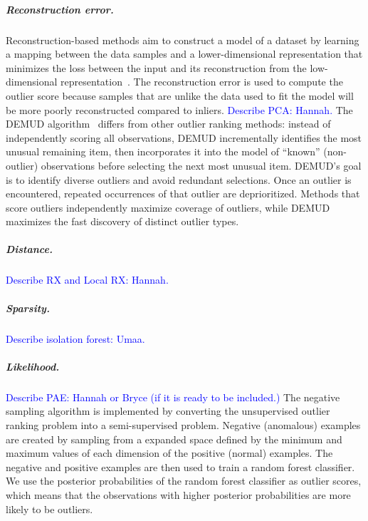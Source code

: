 \documentclass[letterpaper]{article} %
\newcommand{\todo}[1]{\textcolor{blue}{#1}}
\begin{document}
\subparagraph{Reconstruction error.}
Reconstruction-based methods aim to construct a model of a dataset by learning 
a mapping between the data samples and a lower-dimensional representation that
 minimizes the loss between the input and its reconstruction from the 
 low-dimensional representation~\citep{kerner2020comparison}. The 
 reconstruction error is used to compute the outlier score because samples
  that are unlike the data used to fit the model will be more poorly 
  reconstructed compared to inliers. 
\todo{Describe PCA: Hannah.}
The DEMUD algorithm~\citep{wagstaff:demud13} differs from other
outlier ranking methods: instead of independently scoring all
observations, DEMUD incrementally identifies the most unusual
remaining item, then incorporates it into the model of ``known''
(non-outlier) observations before selecting the next most unusual
item.  DEMUD's goal is to identify diverse outliers and avoid
redundant selections.  Once an outlier is encountered, repeated
occurrences of that outlier are deprioritized.  Methods that score
outliers independently maximize coverage of outliers, while DEMUD
maximizes the fast discovery of distinct outlier types.

\subparagraph{Distance.}
\todo{Describe RX and Local RX: Hannah.}

\subparagraph{Sparsity.}
\todo{Describe isolation forest: Umaa.}

\subparagraph{Likelihood.}
\todo{Describe PAE: Hannah or Bryce (if it is ready to be included.)}
The negative sampling algorithm is implemented by converting the unsupervised 
outlier ranking problem into a semi-supervised problem. Negative (anomalous) 
examples are created by sampling from a expanded space defined by the minimum 
and maximum values of each dimension of the positive (normal) examples. The 
negative and positive examples are then used to train a random forest 
classifier. We use the posterior probabilities of the random forest classifier 
as outlier scores, which means that the observations with higher posterior 
probabilities are more likely to be outliers.
\end{document}
